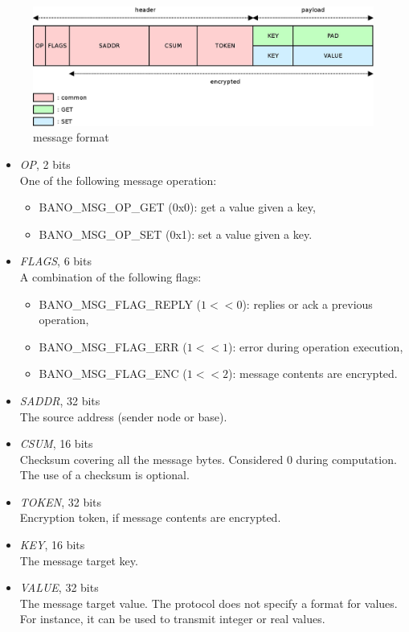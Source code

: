 \documentclass[a4paper, 11pt]{article}
\begin{document}
\paragraph{}
\begin{figure}[!h]
\begin{center}
\includegraphics[scale=0.2]{../dia/msg_format/main.jpeg}
\end{center}
\caption{\tiny{message format}}
\label{msg_format}
\end{figure}

\begin{itemize}
\item \textit{OP}, 2 bits\\
One of the following message operation:
\begin{itemize}
\item BANO\_MSG\_OP\_GET (0x0): get a value given a key,
\item BANO\_MSG\_OP\_SET (0x1): set a value given a key.
\end{itemize}
\item \textit{FLAGS}, 6 bits\\
A combination of the following flags:
\begin{itemize}
\item BANO\_MSG\_FLAG\_REPLY ($1<<0$): replies or ack a previous
operation,
\item BANO\_MSG\_FLAG\_ERR ($1<<1$): error during operation execution,
\item BANO\_MSG\_FLAG\_ENC ($1<<2$): message contents are encrypted.
\end{itemize}
\item \textit{SADDR}, 32 bits\\
The source address (sender node or base).
\item \textit{CSUM}, 16 bits\\
Checksum covering all the message bytes. Considered 0 during computation.
The use of a checksum is optional.
\item \textit{TOKEN}, 32 bits\\
Encryption token, if message contents are encrypted.
\item \textit{KEY}, 16 bits\\
The message target key.
\item \textit{VALUE}, 32 bits\\
The message target value. The protocol does not specify a format for
values. For instance, it can be used to transmit integer or real values.
\end{itemize}
\end{document}
